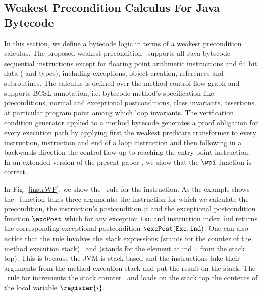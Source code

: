 
\subsection{Weakest Precondition Calculus For Java Bytecode}\label{wpbc}
In this section, we define a bytecode logic in terms of a weakest precondition calculus. The proposed weakest precondition \wpi \ supports all Java bytecode sequential instructions except for floating point arithmetic instructions and 64 bit data ( and  types), including exceptions, object creation,
 references and subroutines. The calculus is defined over the method control flow graph and supports BCSL annotation,
 i.e. bytecode method's specification like preconditions, normal and exceptional postconditions, class invariants,
 assertions at particular program point among which loop invariants. The verification condition generator applied to a method 
bytecode generates a proof obligation for every execution path
 by applying first the weakest predicate transformer to every  instruction,
  instruction and end of a loop instruction and then following in a backwards direction the control
 flow up to reaching the entry point instruction.
 In an extended version of the present paper \cite{JBL05MP}, we show that the $\wpi$ function is correct.

 In Fig.~\ref{instrWP}, we show the \wpi \ rule for the  instruction.
 As the example shows the \wpi \ function takes three arguments:
the instruction for which we calculate the precondition, 
the instruction's postcondition $\psi$ and the exceptional postcondition function $\excPost$ which for any exception \texttt{Exc} and 
instruction index \texttt{ind} returns the
corresponding exceptional postcondition $\excPost(\texttt{Exc}, \tt{ind})$. One can also notice that the rule involves the stack expressions \counter 
(stands for the counter of the method execution stack) \ and  (stands for the element at ind \texttt{i} from the stack top).
 This is because the JVM is stack based and the instructions take their arguments from the method execution stack and 
 put the result on the stack.
 The \wpi \ rule for   increments the stack counter \counter \ and loads on the stack top the contents
 of the local variable $\register{i}$. 




